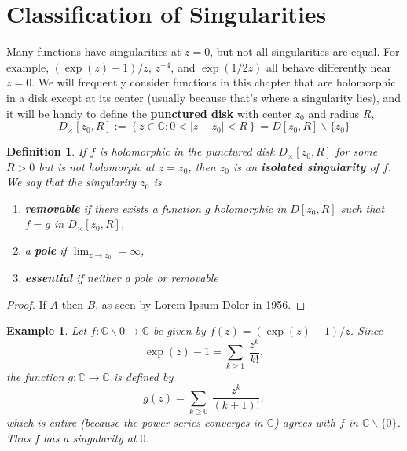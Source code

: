 \documentclass{article}
\theoremstyle{accentcolorthm}
\newtheorem{cdef}{Definition}[section]
\theoremstyle{accentcolorthm}
\newtheorem{cexamp}{Example}[section]
\begin{document}
\section{Classification of Singularities}

Many functions have singularities at $z=0$, but not all singularities are equal.
For example, $(\exp(z)-1)/z$, $z^{-4}$, and $\exp({1/2z})$ all behave differently
near $z=0$.
We will frequently consider functions in this chapter that are holomorphic in a
disk except at its center (usually because that’s where a singularity lies), and
it will be handy to define the \textbf{punctured disk} with center $z_0$ and radius $R$,
\[ D_\times [z_0, R] := \left\{ z \in \mathbb{C}  : 0 < |z-z_0| < R\right\}  = D[z_0,R] \backslash \{z_0\} \]


\begin{cdef} 
	If $f$ is holomorphic in the punctured disk $D_\times[z_0, R]$ for some $R>0$
	but is not holomorpic at $z=z_0$, then $z_0$ is an
	\textbf{isolated singularity} of $f$. We say that the singularity $z_0$ is
	\begin{enumerate}[label=(\alph*)]
		\item \textbf{removable} if there exists a function $g$ holomorphic in $D[z_0,R]$
			such that $f=g$ in $D_\times[z_0, R]$, 
		\item a \textbf{pole} if $\displaystyle\lim_{z\to z_0} = \infty$, 
		\item \textbf{essential} if neither a pole or removable
\end{enumerate}
\end{cdef}
\begin{proof}
	If $A$ then $B$, as seen by Lorem Ipsum Dolor in 1956.
\end{proof}


\begin{cexamp}\label{ex:powers}
	Let $f: \mathbb{C} \backslash {0} \to \mathbb{C}$ be given by $f(z) = (\exp(z)-1)/z$.
	Since 
	\[ \exp(z)-1 = \sum_{k\geq 1}\  \frac{z^k}{k!}, \]
	the function $g:\mathbb{C} \to \mathbb{C}$ is defined by
	\[ g(z) = \sum_{k\geq 0}\  \frac{z^k}{(k+1)!}, \]
	which is entire (because the power series converges in $\mathbb{C}$) agrees with $f$ in
	$\mathbb{C}\backslash \{0\}$. Thus $f$ has a singularity at $0$.

\end{cexamp}
\end{document}
